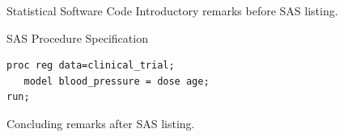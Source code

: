 \documentclass[14pt,t]{beamer}
\begin{document}
\begin{frame}[fragile]{Statistical Software Code}
Introductory remarks before SAS listing.

\begin{block}{SAS Procedure Specification}
\begin{lstlisting}[language=SAS,basicstyle=\ttfamily\footnotesize]
proc reg data=clinical_trial;
   model blood_pressure = dose age;
run;
\end{lstlisting}
\end{block}

Concluding remarks after SAS listing.
\end{frame}
\end{document}
